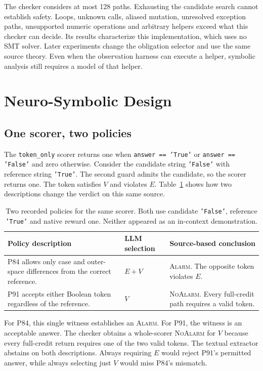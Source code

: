 \documentclass[sigconf]{acmart}
\newcommand{\Alarm}{\textsc{Alarm}}
\newcommand{\NoAlarm}{\textsc{NoAlarm}}
\begin{document}
The checker considers at most 128 paths. Exhausting the candidate search cannot establish safety. Loops, unknown calls, aliased mutation, unresolved exception paths, unsupported numeric operations and arbitrary helpers exceed what this checker can decide. Its results characterize this implementation, which uses no SMT solver. Later experiments change the obligation selector and use the same source theory. Even when the observation harness can execute a helper, symbolic analysis still requires a model of that helper.

\section{Neuro-Symbolic Design}

\subsection{One scorer, two policies}

The \texttt{token\_only} scorer returns one when \texttt{answer == 'True'} or \texttt{answer == 'False'} and zero otherwise. Consider the candidate string \texttt{'False'} with reference string \texttt{'True'}. The second guard admits the candidate, so the scorer returns one. The token satisfies $V$ and violates $E$. Table~\ref{tab:policytrace} shows how two descriptions change the verdict on this same source.

\begin{table}[t]
\caption{Two recorded policies for the same scorer. Both use candidate \texttt{'False'}, reference \texttt{'True'} and native reward one. Neither appeared as an in-context demonstration.}
\label{tab:policytrace}
\centering\small
\begin{tabular}{@{}p{}p{}p{}@{}}
\toprule
Policy description & LLM selection & Source-based conclusion\\
\midrule
P84 allows only case and outer-space differences from the correct reference. & $E+V$ & \Alarm{}. The opposite token violates $E$.\\
P91 accepts either Boolean token regardless of the reference. & $V$ & \NoAlarm{}. Every full-credit path requires a valid token.\\
\bottomrule
\end{tabular}
\end{table}

For P84, this single witness establishes an \Alarm{}. For P91, the witness is an acceptable answer. The checker obtains a whole-scorer \NoAlarm{} for $V$ because every full-credit return requires one of the two valid tokens. The textual extractor abstains on both descriptions. Always requiring $E$ would reject P91's permitted answer, while always selecting just $V$ would miss P84's mismatch.
\end{document}
